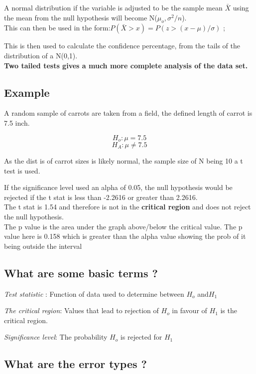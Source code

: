 \documentclass[11pt]{scrartcl} %
\begin{document}
A normal distribution if the variable is adjusted to be the sample mean
\(\bar{X}\) using the mean from the null hypothesis will become
N(\(\mu_o,\sigma^2/n\)).\\

This can then be used in the form:\(P(\bar{X} > x) = P(z > (x-\mu) /\sigma)\) ; 

This is then used to calculate the confidence percentage, from the tails of the distribution
of a N(0,1).\\

\textbf{Two tailed tests gives a much more complete analysis of the data
set.}

\subsection{Example}

A random sample of carrots are taken from a field, the defined length of carrot is 7.5 inch.

\[H_o:\mu =7.5\] 
\[H_A:\mu\neq 7.5\]

As the dist is of carrot sizes is likely normal, the sample size of N being 10 a t test is used.

If the significance level used an alpha of 0.05, the null hypothesis would be rejected if the t stat
is less than -2.2616 or greater than 2.2616. \\

The t stat is 1.54 and therefore is not in the \textbf{critical region} and does not reject the null
hypothesis. \\

The p value is the area under the graph above/below the critical value. The p value here is 0.158
which is greater than the alpha value showing the prob of it being outside the interval 

\subsection{What are some basic terms
?}

\emph{Test statistic} : Function of data used to determine between
\(H_o\) and\(H_1\)

\emph{The critical region}: Values that lead to rejection of \(H_o\) in
favour of \(H_1\) is the critical region.

\emph{Significance level}: The probability \(H_o\) is rejected for
\(H_1\)

\subsection{What are the error types
?}
\end{document}

